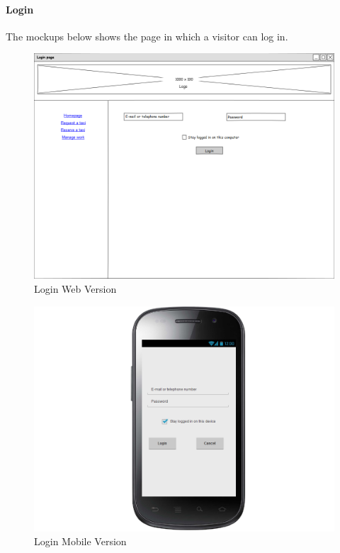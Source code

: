 \documentclass[a4paper,12pt]{article}%
\begin{document}
\paragraph{Login}
The mockups below shows the page in which a visitor can log in.
\begin{figure}[H]
\centering
\includegraphics[scale=0.35]{mockups/login_web.png}
\caption{Login Web Version}
\end{figure}
\begin{figure}[H]
\centering
\includegraphics[scale=0.35]{mockups/login_mobile.png}
\caption{Login Mobile Version}
\end{figure}
\break
\end{document}
